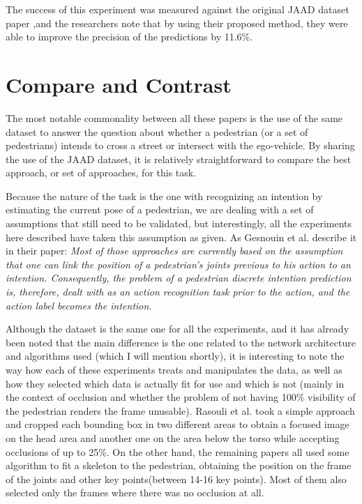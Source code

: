 \documentclass[conference, onecolumn]{IEEEtran}
\begin{document}
The success of this experiment was measured against the original JAAD dataset paper \cite{rasouli2017ICCVW},and the researchers note that by using their proposed method, they were able to improve the precision of the predictions by 11.6\%.

\section{Compare and Contrast}\label{sec:compare-and-contrast}
The most notable commonality between all these papers is the use of the same dataset to answer the question about whether a pedestrian (or a set of pedestrians) intends to cross a street or intersect with the ego-vehicle. By sharing the use of the JAAD dataset, it is relatively straightforward to compare the best approach, or set of approaches, for this task.

Because the nature of the task is the one with recognizing an intention by estimating the current pose of a pedestrian, we are dealing with a set of assumptions that still need to be validated, but interestingly, all the experiments here described have taken this assumption as given.  As Gesnouin et al. describe it in their paper: \emph{Most of those approaches are currently based on the assumption that one can link the position of a pedestrian's joints previous to his action to an intention. Consequently, the problem of a pedestrian discrete intention prediction is, therefore, dealt with as an action recognition task prior to the action, and the action label becomes the intention}.

Although the dataset is the same one for all the experiments, and it has already been noted that the main difference is the one related to the network architecture and algorithms used (which I will mention shortly), it is interesting to note the way how each of these experiments treats and manipulates the data, as well as how they selected which data is actually fit for use and which is not (mainly in the context of occlusion and whether the problem of not having 100\% visibility of the pedestrian renders the frame unusable). Rasouli et al.\cite{rasouli2017ICCVW} took a simple approach and cropped each bounding box in two different areas to obtain a focused image on the head area and another one on the area below the torso while accepting occlusions of up to 25\%. On the other hand, the remaining papers all used some algorithm to fit a skeleton to the pedestrian, obtaining the position on the frame of the joints and other key points(between 14-16 key points). Most of them also selected only the frames where there was no occlusion at all.
\end{document}
